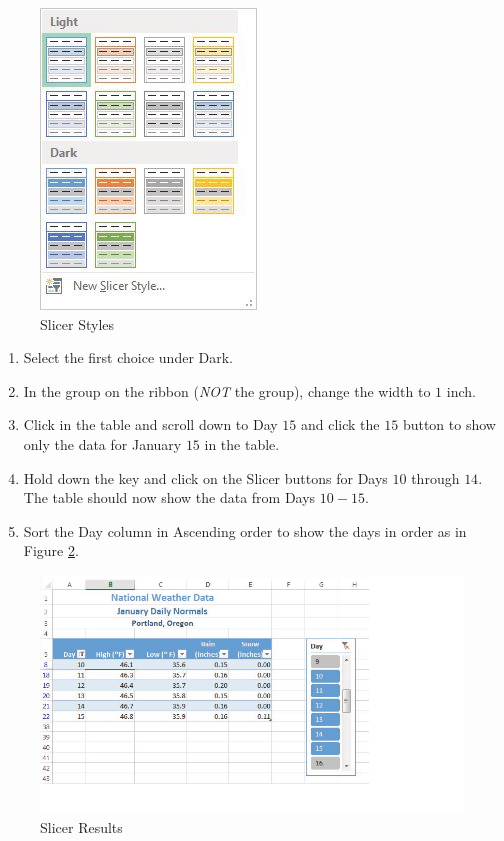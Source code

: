 \begin{figure}[H]
	\centering
	\includegraphics[width=\maxwidth{.95\linewidth}]{gfx/ch05_fig20}
	\caption{Slicer Styles}
	\label{05:fig20}
\end{figure}

\begin{enumerate}
	\item Select the first choice under Dark.
	\item In the  group on the  ribbon (\textit{NOT} the  group), change the width to $ 1 $ inch.
	\item Click in the table and scroll down to Day $ 15 $ and click the $ 15 $ button to show only the data for January $ 15 $ in the table.
	\item Hold down the  key and click on the Slicer buttons for Days $ 10 $ through $ 14 $. The table should now show the data from Days $ 10-15 $.
	\item Sort the Day column in Ascending order to show the days in order as in Figure \ref{05:fig21}.
\end{enumerate}

\begin{figure}[H]
	\centering
	\includegraphics[width=\maxwidth{.95\linewidth}]{gfx/ch05_fig21}
	\caption{Slicer Results}
	\label{05:fig21}
\end{figure}

